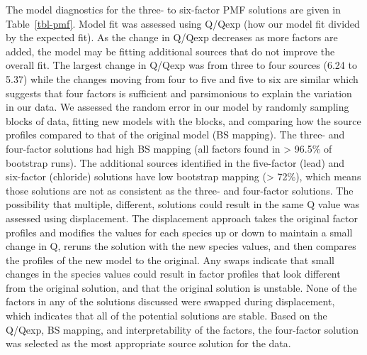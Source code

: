 \documentclass[
  letterpaper,
  DIV=11,
  numbers=noendperiod]{scrartcl}
\begin{document}
The model diagnostics for the three- to six-factor PMF solutions are
given in Table~\ref{tbl-pmf}. Model fit was assessed using Q/Qexp (how
our model fit divided by the expected fit). As the change in Q/Qexp
decreases as more factors are added, the model may be fitting additional
sources that do not improve the overall fit. The largest change in
Q/Qexp was from three to four sources (6.24 to 5.37) while the changes
moving from four to five and five to six are similar which suggests that
four factors is sufficient and parsimonious to explain the variation in
our data. We assessed the random error in our model by randomly sampling
blocks of data, fitting new models with the blocks, and comparing how
the source profiles compared to that of the original model (BS mapping).
The three- and four-factor solutions had high BS mapping (all factors
found in \textgreater{} 96.5\% of bootstrap runs). The additional
sources identified in the five-factor (lead) and six-factor (chloride)
solutions have low bootstrap mapping (\textgreater{} 72\%), which means
those solutions are not as consistent as the three- and four-factor
solutions. The possibility that multiple, different, solutions could
result in the same Q value was assessed using displacement. The
displacement approach takes the original factor profiles and modifies
the values for each species up or down to maintain a small change in Q,
reruns the solution with the new species values, and then compares the
profiles of the new model to the original. Any swaps indicate that small
changes in the species values could result in factor profiles that look
different from the original solution, and that the original solution is
unstable. None of the factors in any of the solutions discussed were
swapped during displacement, which indicates that all of the potential
solutions are stable. Based on the Q/Qexp, BS mapping, and
interpretability of the factors, the four-factor solution was selected
as the most appropriate source solution for the data.
\end{document}
